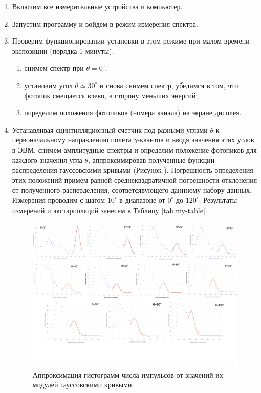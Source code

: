 \documentclass[a4paper,12pt]{article}
\begin{document}
\begin{enumerate}
	\item Включим все измерительные устройства и компьютер.
	\item Запустим программу и войдем в режим измерения спектра.
 \newpage
	\item Проверим функционировании установки в этом режиме при малом времени экспозиции (порядка 1 минуты):
	\begin{enumerate}
		\item снимем спектр при $\theta=0^\circ$;
		\item установим угол $\theta\simeq 30^\circ$ и снова снимем спектр, убедимся в том, что фотопик смещается влево, в сторону меньших энергий;
		\item определим положения фотопиков (номера канала) на экране дисплея.
	\end{enumerate}
	\item Устанавливая сцинтилляционный счетчик под разными углами $\theta$ к первоначальному направлению полета $\gamma$-квантов и вводя значения этих углов в ЭВМ, снимем амплитудные спектры и определим положение фотопиков для каждого значения угла $\theta$, аппроксимировав полученные функции распределения гауссовскими кривыми (Рисунок ). Погрешность определения этих положений примем равной среднеквадратичной погрешности отклонения от полученного расперделения, соответсявующего даннному набору данных. Измерения проводим с шагом $10^\circ$ в диапазоне от $0^\circ$ до $120^\circ$. Результаты измерений и экстарполяций занесем в Таблицу \ref{tab:my-table}.

\begin{figure}[!h]
		\includegraphics[width=\textwidth]{4.png}
		\caption{Аппроксимация гистограмм числа импульсов от значений их модулей гауссовскими кривыми. }
		\label{fig:graph}
	\end{figure}
 

\end{enumerate}
\end{document}
